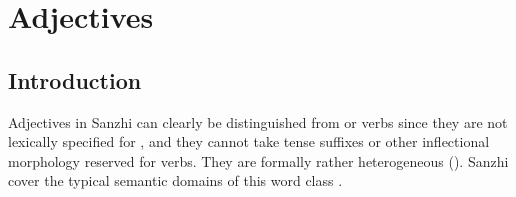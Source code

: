 \chapter{Adjectives}
\label{cpt:morph-adjectives}
\section{Introduction}
\label{sec:Other syntactic properties}

Adjectives in Sanzhi can clearly be distinguished from  or verbs since they are not lexically specified for , and they cannot take tense suffixes or other inflectional morphology reserved for verbs. They are formally rather heterogeneous ().  
Sanzhi  cover the typical semantic domains of this word class .
%
